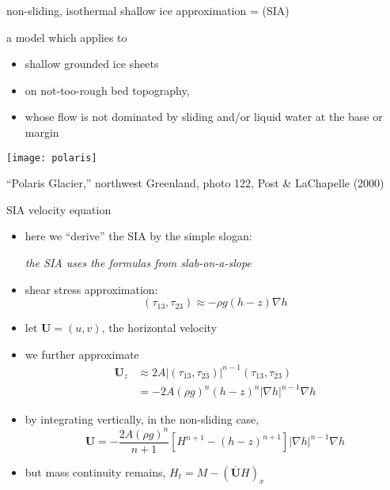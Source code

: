 \begin{frame}{non-sliding, isothermal shallow ice approximation = (SIA)}

a model which applies to
\begin{itemize}
\item shallow grounded ice sheets
\item on not-too-rough bed topography,
\item whose flow is not dominated by sliding and/or liquid water at the base or margin
\end{itemize}

\begin{center}
  \texttt{[image: polaris]}

\tiny ``Polaris Glacier,'' northwest Greenland, photo 122, Post \& LaChapelle (2000)
\end{center}

\end{frame}


\begin{frame}{SIA velocity equation}

\begin{itemize}
\item \small here we ``derive'' the SIA by the simple slogan:\normalsize

\begin{center}
\emph{the SIA uses the formulas from slab-on-a-slope}
\end{center}
\item shear stress approximation:
	$$(\tau_{13},\tau_{23}) \approx - \rho g (h-z) \nabla h$$
\item let $\mathbf{U} = (u,v)$, the horizontal velocity
\item we further approximate
\begin{align*}
\mathbf{U}_z &\approx 2 A |(\tau_{13},\tau_{23})|^{n-1} (\tau_{13},\tau_{23}) \\
     &= - 2 A (\rho g)^n (h-z)^n |\nabla h|^{n-1} \nabla h
\end{align*}
\item by integrating vertically, in the non-sliding case,
    $$\mathbf{U} = - \frac{2 A (\rho g)^n}{n+1} \left[H^{n+1} - (h-z)^{n+1}\right] |\nabla h|^{n-1} \nabla h$$
\item but mass continuity remains, $H_t = M - \left(\overline{\mathbf{U}} H\right)_x$
\end{itemize}
\end{frame}


